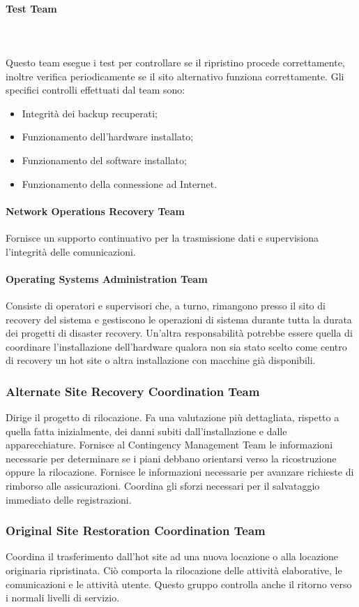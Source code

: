 \documentclass[12pt, a4paper, titlepage]{report}
\newcommand{\myparagraph}[1]{\paragraph{#1}\mbox{} \mbox{}}
\begin{document}
			\myparagraph{Test Team}\\
			\\Questo team esegue i test per controllare se il ripristino procede correttamente, inoltre verifica periodicamente se il sito alternativo funziona correttamente. Gli specifici controlli effettuati dal team sono: 
			\begin{itemize}
				\item Integrità dei backup recuperati;
				\item Funzionamento dell'hardware installato;
				\item Funzionamento del software installato;
				\item Funzionamento della connessione ad Internet.
			\end{itemize}
			
			\myparagraph{Network Operations Recovery Team}
			
			Fornisce un supporto continuativo per la trasmissione dati e supervisiona l'integrità delle comunicazioni.			
			
			\myparagraph{Operating Systems Administration Team}
			
			Consiste di operatori e supervisori che, a turno, rimangono presso il sito di recovery del sistema e gestiscono le operazioni di sistema durante tutta la durata dei progetti di disaster recovery. Un'altra responsabilità potrebbe essere quella di coordinare l'installazione dell'hardware qualora non sia stato scelto come centro di recovery un hot site o altra installazione con macchine già disponibili.
			
			
			\subsubsection{Alternate Site Recovery Coordination Team}
			Dirige il progetto di rilocazione. Fa una valutazione più dettagliata, rispetto a quella fatta inizialmente, dei danni subiti dall'installazione e dalle apparecchiature. Fornisce al Contingency Management Team le informazioni necessarie per determinare se i piani debbano orientarsi verso la ricostruzione oppure la rilocazione. Fornisce le informazioni necessarie per avanzare richieste di rimborso alle assicurazioni. Coordina gli sforzi necessari per il salvataggio immediato delle registrazioni.
			
			\subsubsection{Original Site Restoration Coordination Team}
			Coordina il trasferimento dall'hot site ad una nuova locazione o alla locazione originaria ripristinata. Ciò comporta la rilocazione delle attività elaborative, le comunicazioni e le attività utente. Questo gruppo controlla anche il ritorno verso i normali livelli di servizio.
			
\end{document}
